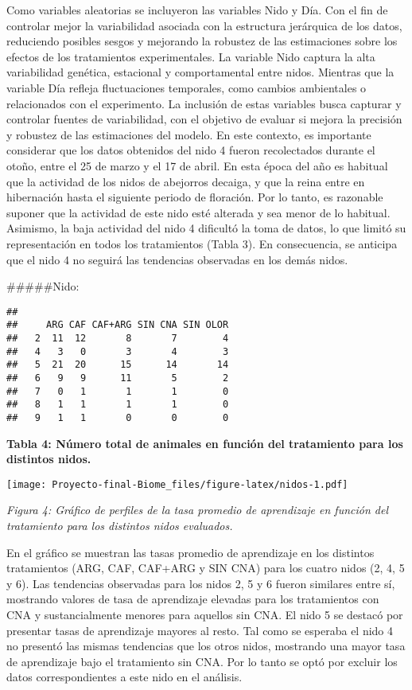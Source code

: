 \documentclass[
  11pt,
]{article}
\begin{document}
Como variables aleatorias se incluyeron las variables Nido y Día. Con el
fin de controlar mejor la variabilidad asociada con la estructura
jerárquica de los datos, reduciendo posibles sesgos y mejorando la
robustez de las estimaciones sobre los efectos de los tratamientos
experimentales. La variable Nido captura la alta variabilidad genética,
estacional y comportamental entre nidos. Mientras que la variable Día
refleja fluctuaciones temporales, como cambios ambientales o
relacionados con el experimento. La inclusión de estas variables busca
capturar y controlar fuentes de variabilidad, con el objetivo de evaluar
si mejora la precisión y robustez de las estimaciones del modelo. En
este contexto, es importante considerar que los datos obtenidos del nido
4 fueron recolectados durante el otoño, entre el 25 de marzo y el 17 de
abril. En esta época del año es habitual que la actividad de los nidos
de abejorros decaiga, y que la reina entre en hibernación hasta el
siguiente periodo de floración. Por lo tanto, es razonable suponer que
la actividad de este nido esté alterada y sea menor de lo habitual.
Asimismo, la baja actividad del nido 4 dificultó la toma de datos, lo
que limitó su representación en todos los tratamientos (Tabla 3). En
consecuencia, se anticipa que el nido 4 no seguirá las tendencias
observadas en los demás nidos.

\#\#\#\#\#Nido:

\begin{verbatim}
##    
##     ARG CAF CAF+ARG SIN CNA SIN OLOR
##   2  11  12       8       7        4
##   4   3   0       3       4        3
##   5  21  20      15      14       14
##   6   9   9      11       5        2
##   7   0   1       1       1        0
##   8   1   1       1       1        0
##   9   1   1       0       0        0
\end{verbatim}

\textbf{Tabla 4: Número total de animales en función del tratamiento
para los distintos nidos.}

\texttt{[image: Proyecto-final-Biome\_files/figure-latex/nidos-1.pdf]}

\emph{Figura 4: Gráfico de perfiles de la tasa promedio de aprendizaje
en función del tratamiento para los distintos nidos evaluados.}

En el gráfico se muestran las tasas promedio de aprendizaje en los
distintos tratamientos (ARG, CAF, CAF+ARG y SIN CNA) para los cuatro
nidos (2, 4, 5 y 6). Las tendencias observadas para los nidos 2, 5 y 6
fueron similares entre sí, mostrando valores de tasa de aprendizaje
elevadas para los tratamientos con CNA y sustancialmente menores para
aquellos sin CNA. El nido 5 se destacó por presentar tasas de
aprendizaje mayores al resto. Tal como se esperaba el nido 4 no presentó
las mismas tendencias que los otros nidos, mostrando una mayor tasa de
aprendizaje bajo el tratamiento sin CNA. Por lo tanto se optó por
excluir los datos correspondientes a este nido en el análisis.
\end{document}
